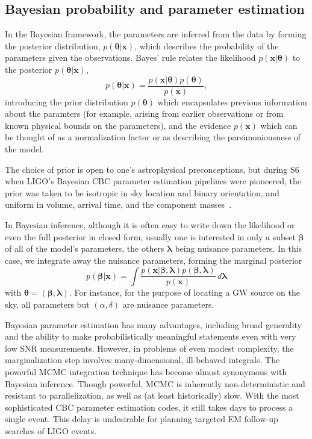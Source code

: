 \documentclass{iopart}
\begin{document}
\subsection{Bayesian probability and parameter estimation}

In the Bayesian framework, the parameters are inferred from the data by forming the posterior distribution, $p(\boldsymbol\theta|\mathbf x)$, which describes the probability of the parameters given the observations. Bayes' rule relates the likelihood $p(\mathbf x|\boldsymbol\theta)$ to the posterior $p(\boldsymbol\theta|\mathbf x)$,
%
\begin{equation}\label{bayes}
p(\boldsymbol\theta|\mathbf x) = \frac{p(\mathbf x|\boldsymbol\theta) p(\boldsymbol\theta)}{p(\mathbf x)},
\end{equation}
%
introducing the prior distribution $p(\boldsymbol\theta)$ which encapsulates previous information about the paramters (for example, arising from earlier observations or from known physical bounds on the parameters), and the evidence $p(\mathbf x)$ which can be thought of as a normalization factor or as describing the parsimoniousness of the model.

The choice of prior is open to one's astrophysical preconceptions, but during \ac{S6} when \ac{LIGO}'s Bayesian \ac{CBC} parameter estimation pipelines were pioneered, the prior was taken to be isotropic in sky location and binary orientation, and uniform in volume, arrival time, and the component masses~\cite{2013arXiv1304.1775T}.

In Bayesian inference, although it is often easy to write down the likelihood or even the full posterior in closed form, usually one is interested in only a subset $\boldsymbol\beta$ of all of the model's parameters, the others $\boldsymbol\lambda$ being nuisance parameters. In this case, we integrate away the nuisance parameters, forming the marginal posterior
%
\begin{equation}\label{eq:marginal-posterior}
	p(\boldsymbol\beta|\mathbf x) = \int \frac{p(\mathbf x|\boldsymbol\beta,\boldsymbol\lambda) p(\boldsymbol\beta,\boldsymbol\lambda)}{p(\mathbf x)} \,d\boldsymbol\lambda
\end{equation}
%
with $\boldsymbol\theta = (\boldsymbol\beta, \boldsymbol\lambda)$. For instance, for the purpose of locating a \ac{GW} source on the sky, all parameters but $(\alpha, \delta)$ are nuisance parameters.

Bayesian parameter estimation has many advantages, including broad generality and the ability to make probabilistically meaningful statements even with very low \ac{SNR} measurements. However, in problems of even modest complexity, the marginalization step involves many-dimensional, ill-behaved integrals. The powerful \ac{MCMC} integration technique has become almost synonymous with Bayesian inference. Though powerful, \ac{MCMC} is inherently non-deterministic and resistant to parallelization, as well as (at least historically) slow. With the most sophisticated \ac{CBC} parameter estimation codes, it still takes days to process a single event. This delay is undesirable for planning targeted \ac{EM} follow\nobreakdashes-up searches of \ac{LIGO} events.
\end{document}
